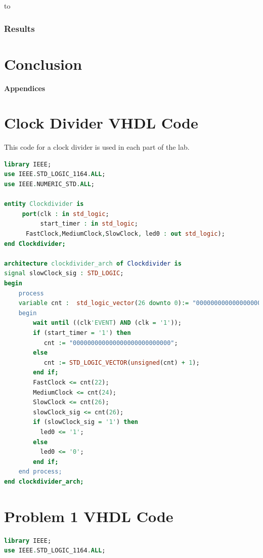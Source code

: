 to\documentclass[11pt]{article}
\begin{document}
\subsubsection{Results}



\section{Conclusion}


\pagebreak

\textbf{Appendices}

\begin{appendices}

\section{Clock Divider VHDL Code}
This code for a clock divider is used in each part of the lab.

\begin{lstlisting}[language=VHDL]
library IEEE;
use IEEE.STD_LOGIC_1164.ALL;
use IEEE.NUMERIC_STD.ALL;

entity Clockdivider is
     port(clk : in std_logic;
          start_timer : in std_logic;
	  FastClock,MediumClock,SlowClock, led0 : out std_logic);
end Clockdivider;

architecture clockdivider_arch of Clockdivider is
signal slowClock_sig : STD_LOGIC;
begin
    process  
    variable cnt :	std_logic_vector(26 downto 0):= "000000000000000000000000000";
    begin					 
        wait until ((clk'EVENT) AND (clk = '1'));
		if (start_timer = '1') then
	       cnt := "000000000000000000000000000";
	    else  
           cnt := STD_LOGIC_VECTOR(unsigned(cnt) + 1);
	    end if;
   	    FastClock <= cnt(22);
   	    MediumClock <= cnt(24);	
   	    SlowClock <= cnt(26);
        slowClock_sig <= cnt(26);
        if (slowClock_sig = '1') then
		  led0 <= '1';
	    else
		  led0 <= '0';
	    end if;
	end process;
end clockdivider_arch;
\end{lstlisting}

\section{Problem 1 VHDL Code}

\begin{lstlisting}[language=VHDL]
library IEEE;
use IEEE.STD_LOGIC_1164.ALL;


\end{lstlisting}
\end{appendices}
\end{document}
